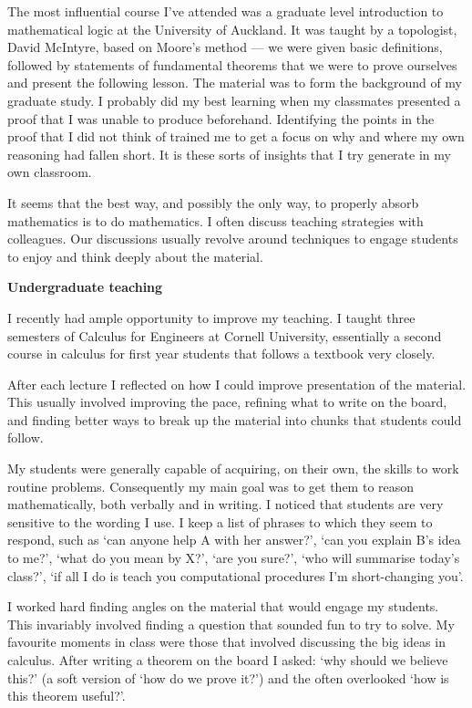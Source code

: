 \documentclass[12pt]{article}
\theoremstyle{plain} \numberwithin{equation}{section}
\theoremstyle{definition}
\begin{document}
\thispagestyle{fancy}

The most influential course I've attended was a graduate level introduction to
mathematical logic at the University of Auckland.  It was taught by a topologist, David McIntyre, based on Moore's method --- 
we were given basic definitions, followed by statements of
fundamental theorems that we were to prove ourselves and present the following
lesson. The material was to form the background of my
graduate study. I probably did my best learning when my classmates presented a
proof that I was unable to produce beforehand. Identifying the points in the proof that I
did not think of trained me to get a focus on why and where my own reasoning
had fallen short. It is these sorts of insights that I try generate in my own classroom.

It seems that the best way, and possibly the only way, to properly absorb mathematics is to do mathematics. 
 I often discuss teaching strategies with colleagues.
Our discussions usually revolve around techniques to engage students to enjoy and think deeply about the material.

{\bf Undergraduate teaching}

 I recently had ample opportunity to improve my teaching. 
I taught three semesters of Calculus for Engineers at Cornell University, essentially a second course in calculus for first year students that follows a textbook very closely.

After each lecture I reflected on how I could improve presentation of the material. This usually involved improving the pace, refining what to write on the board, and finding better ways to break up the material into chunks that students could follow.

My students were generally capable of acquiring, on their own, the skills to work routine problems. %
Consequently my main goal 
was to get them to reason mathematically, both verbally and in writing. I noticed that students are very sensitive to the wording I use.
I keep a list of phrases to which they seem to respond, such as  `can anyone help A with her answer?', `can you explain B's idea to me?', `what do you mean by X?',
`are you sure?', `who will summarise today's class?', `if all I do is teach you computational procedures I'm short-changing you'.

I worked hard finding angles on the material that would engage my students. This invariably involved finding a question that
sounded fun to try to solve. My favourite moments in class were those that involved discussing the big ideas in calculus. After writing a theorem on the board I asked: `why should we believe this?' (a soft version of `how do we prove it?') and the often overlooked `how is this theorem useful?'.
\end{document}

